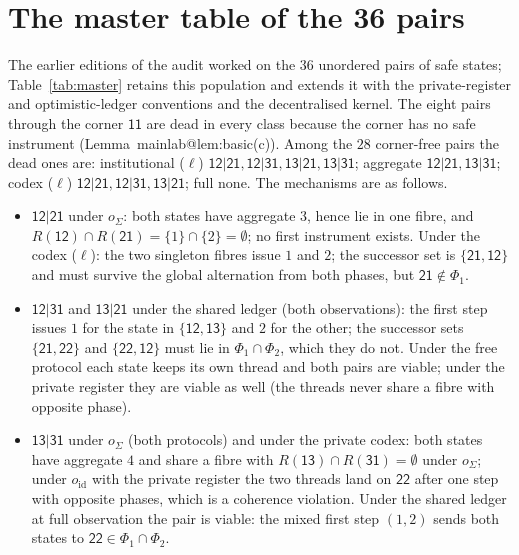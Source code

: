 \documentclass[11pt,a4paper]{article}
\makeatletter
\theoremstyle{plain}
\theoremstyle{definition}
\theoremstyle{remark}
\newcommand{\st}[1]{\mathsf{#1}}
\newcommand{\led}{\ell}
\newcommand{\ofull}{o_{\mathrm{id}}}
\newcommand{\oagg}{o_{\Sigma}}
\newcommand{\mref}[1]{\csname mainlab@#1\endcsname}
\makeatother
\begin{document}
\section{The master table of the 36 pairs}\label{si:master}

The earlier editions of the audit worked on the $36$ unordered pairs of safe states; Table~\ref{tab:master} retains this population and extends it with the private-register and optimistic-ledger conventions and the decentralised kernel. The eight pairs through the corner $\st{11}$ are dead in every class because the corner has no safe instrument (Lemma~\mref{lem:basic}(c)). Among the $28$ corner-free pairs the dead ones are: institutional ($\led$) $\st{12|21},\st{12|31},\st{13|21},\st{13|31}$; aggregate $\st{12|21},\st{13|31}$; codex ($\led$) $\st{12|21},\st{12|31},\st{13|21}$; full none. The mechanisms are as follows.
\begin{itemize}[leftmargin=2em,itemsep=1pt]
\item $\st{12|21}$ under $\oagg$: both states have aggregate $3$, hence lie in one fibre, and $R(\st{12})\cap R(\st{21})=\{1\}\cap\{2\}=\emptyset$; no first instrument exists. Under the codex ($\led$): the two singleton fibres issue $1$ and $2$; the successor set is $\{\st{21},\st{12}\}$ and must survive the global alternation from both phases, but $\st{21}\notin\Phi_1$.
\item $\st{12|31}$ and $\st{13|21}$ under the shared ledger (both observations): the first step issues $1$ for the state in $\{\st{12},\st{13}\}$ and $2$ for the other; the successor sets $\{\st{21},\st{22}\}$ and $\{\st{22},\st{12}\}$ must lie in $\Phi_1\cap\Phi_2$, which they do not. Under the free protocol each state keeps its own thread and both pairs are viable; under the private register they are viable as well (the threads never share a fibre with opposite phase).
\item $\st{13|31}$ under $\oagg$ (both protocols) and under the private codex: both states have aggregate $4$ and share a fibre with $R(\st{13})\cap R(\st{31})=\emptyset$ under $\oagg$; under $\ofull$ with the private register the two threads land on $\st{22}$ after one step with opposite phases, which is a coherence violation. Under the shared ledger at full observation the pair is viable: the mixed first step $(1,2)$ sends both states to $\st{22}\in\Phi_1\cap\Phi_2$.
\end{itemize}
\end{document}
